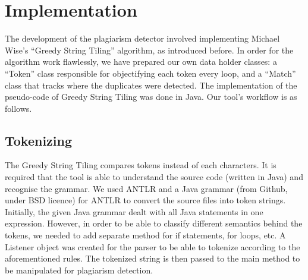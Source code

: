 \section{Implementation}
The development of the plagiarism detector involved implementing Michael Wise’s “Greedy String Tiling” algorithm, as introduced before. In order for the algorithm work flawlessly, we have prepared our own data holder classes: a “Token” class responsible for objectifying each token every loop, and a “Match” class that tracks where the duplicates were detected. The implementation of the pseudo-code of Greedy String Tiling was done in Java. Our tool’s workflow is as follows. 

\subsection{Tokenizing}
The Greedy String Tiling compares tokens instead of each characters. It is required that the tool is able to understand the source code (written in Java) and recognise the grammar. We used ANTLR and a Java grammar (from Github, under BSD licence) for ANTLR to convert the source files into token strings. Initially, the given Java grammar dealt with all Java statements in one expression. However, in order to be able to classify different semantics behind the tokens, we needed to add separate method for if statements, for loops, etc. A Listener object was created for the parser to be able to tokenize according to the aforementioned rules. The tokenized string is then passed to the main method to be manipulated for plagiarism detection.

